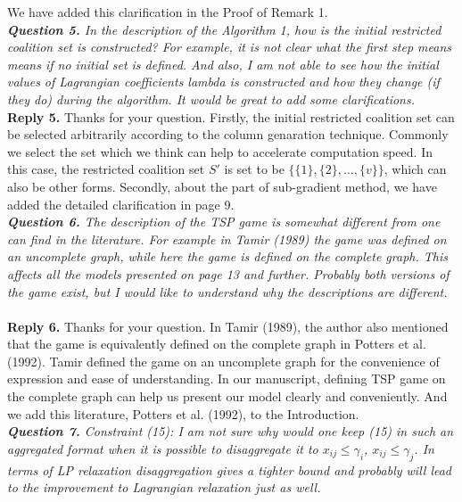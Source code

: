 \documentclass[11pt]{article}
\begin{document}
We have added this clarification in the Proof of Remark 1.
\\[4mm]
%
%
%
\noindent \textit{\textbf{Question 5.}
In the description of the Algorithm 1, how is the initial restricted coalition set is constructed? For example, it is not clear what the first step means means if no initial set is defined. And also, I am not able to see how the initial values of Lagrangian coefficients lambda is constructed and how they change (if they do) during the algorithm. It would be great to add some clarifications.}
~\\[2mm]
\noindent \textbf{Reply 5.}
Thanks for your question. Firstly, the initial restricted coalition set can be selected arbitrarily according to the column genaration technique. Commonly we select the set which we think can help to accelerate computation speed. In this case, the restricted coalition set $S'$ is set to be $\{\{1\},\{2\},\ldots, \{v\}\}$, which can also be other forms.
Secondly, about the part of sub-gradient method, we have added the detailed clarification in page 9.
\\[4mm]
%
%
\noindent \textit{\textbf{Question 6.}
The description of the TSP game is somewhat different from one can find in the literature. For example in Tamir (1989) the game was defined on an uncomplete graph, while here the game is defined on the complete graph. This affects all the models presented on page 13 and further. Probably both versions of the game exist, but I would like to understand why the descriptions are different.}
~\\[2mm]
\noindent \textbf{Reply 6.}
Thanks for your question. In Tamir (1989), the author also mentioned that the game is equivalently defined on the complete graph in Potters et al. (1992). Tamir defined the game on an uncomplete graph for the convenience of expression and ease of understanding. In our manuscript, defining TSP game on the complete graph can help us present our model clearly and conveniently. And we add this literature, Potters et al. (1992), to the Introduction.
\\[4mm]
\noindent \textit{\textbf{Question 7.}
Constraint (15): I am not sure why would one keep (15) in such an aggregated format when it is possible to disaggregate it to $x_{ij} \leq \gamma_i$, $x_{ij} \leq \gamma_j$. In terms of LP relaxation disaggregation gives a tighter bound and probably will lead to the improvement to Lagrangian relaxation just as well.}
\end{document}
